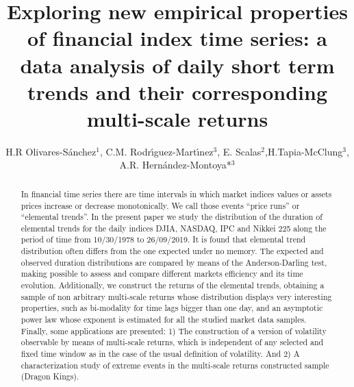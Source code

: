 \documentclass[a4paper]{jpconf}
\begin{document}
\title{Exploring new empirical properties of  financial index time series: a data analysis of daily short term trends and their corresponding multi-scale returns}


\author{H.R Olivares-S\'anchez$^1$, C.M. Rodr\'{\i}guez-Mart\'{\i}nez$^3$, E. Scalas$^2$,H.Tapia-McClung$^3$, A.R. Hern\'andez-Montoya*$^3$}

\address{$^1$Department of Astrophysics, Radboud University, P.O. Box 9010, 6500 GL Nijmegen, The Netherlands.}

\address{$^2$Centro de Investigaci\'on en Inteligencia Artificial. Universidad Veracruzana. Sebasti\'an Camacho 5, Xalapa Veracruz 91000, M\'exico. Tel/Fax: 52-228-8172957/8172855.}

\address{$^3$Department of Mathematics, School of Mathematical and Physical Sciences, University of Sussex, Brighton, BN1 9QH, United Kingdom.}

\address{$^4$Facultad de F\'{\i}sica. Universidad Veracruzana, Apdo. Postal 475. Xalapa, Veracruz. M\'{e}xico.}




\begin{abstract}
In financial time series there are time intervals in which market indices values or assets prices increase or decrease monotonically. We call those events ``price runs''  or ``elemental trends''. In the present paper  we study  the distribution of the  duration of elemental trends for the daily indices DJIA, NASDAQ, IPC and Nikkei 225 along the period of time from 10/30/1978  to 26/09/2019.  It is found that elemental trend distribution often differs from the one expected under no memory.  The expected and observed duration distributions are compared by means of the Anderson-Darling test, making possible to assess and compare different markets efficiency and its time evolution.  Additionally, we construct  the returns of the elemental trends,  obtaining a sample of non arbitrary  multi-scale returns whose distribution displays very interesting properties, such as  bi-modality for time lags bigger than one day, and an asymptotic power law whose exponent is estimated for all the studied market data samples. Finally, some applications are presented: 1) The construction of a version of volatility observable by means of multi-scale returns, which is  independent of any selected and fixed time window as in the case of the usual definition of volatility.  And 2)  A characterization  study  of extreme events in  the multi-scale returns constructed sample (Dragon Kings).
\end{abstract}
\end{document}
